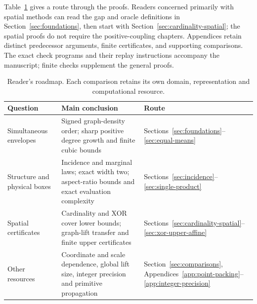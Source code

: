 \documentclass[11pt]{article}
\begin{document}
Table~\ref{tab:roadmap} gives a route through the proofs. Readers concerned
primarily with spatial methods can read the gap and oracle definitions in
Section~\ref{sec:foundations}, then start with
Section~\ref{sec:cardinality-spatial}; the spatial proofs do not require
the positive-coupling chapters. Appendices retain distinct predecessor
arguments, finite certificates, and supporting comparisons. The exact
check programs and their replay instructions accompany the manuscript;
finite checks supplement the general proofs.
\begin{table}[htbp]
\centering\small
\begin{tabular}{@{}p{}p{}p{}@{}}
\toprule
Question & Main conclusion & Route \\
\midrule
Simultaneous envelopes & Signed graph-density order; sharp positive
 degree growth and finite cubic bounds & Sections~\ref{sec:foundations}--\ref{sec:equal-means} \\
Structure and physical boxes & Incidence and marginal laws; exact width
 two; aspect-ratio bounds and exact evaluation complexity &
 Sections~\ref{sec:incidence}--\ref{sec:single-product} \\
Spatial certificates & Cardinality and XOR cover lower bounds;
 graph-lift transfer and finite upper certificates &
 Sections~\ref{sec:cardinality-spatial}--\ref{sec:xor-upper-affine} \\
Other resources & Coordinate and scale dependence, global lift size,
 integer precision and primitive propagation &
 Section~\ref{sec:comparisons}, Appendices~\ref{app:point-packing}--\ref{app:integer-precision} \\
\bottomrule
\end{tabular}
\caption{Reader's roadmap. Each comparison retains its own domain,
representation and computational resource.}\label{tab:roadmap}
\end{table}


















\appendix













\end{document}
